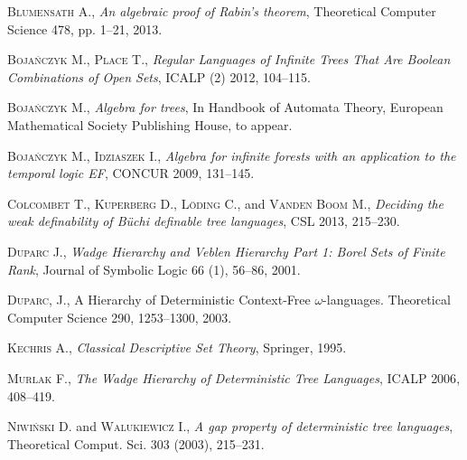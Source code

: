 \begin{thebibliography}{00}

\textsc{Blumensath} A., \emph{An algebraic proof of Rabin's theorem}, Theoretical Computer Science \textsc{478}, pp. 1--21, 2013.

\textsc{Boja\'nczyk} M., \textsc{Place} T., \emph{Regular Languages of Infinite Trees That Are Boolean Combinations of Open Sets}, ICALP (2) \textsc{2012}, 104--115.

\textsc{Boja\'nczyk} M., \emph{Algebra for trees}, In Handbook of Automata Theory, European
Mathematical Society Publishing House, to appear.

\textsc{Boja\'nczyk} M., \textsc{Idziaszek} I., \emph{Algebra for infinite forests with an
application to the temporal logic EF}, CONCUR \textsc{2009}, 131--145.


\textsc{Colcombet} T., \textsc{Kuperberg} D., \textsc{Löding} C., and \textsc{Vanden Boom} M., \emph{Deciding the weak definability of Büchi definable tree languages}, CSL \textsc{2013}, 215--230.


\textsc{Duparc} J., \emph{Wadge Hierarchy and Veblen Hierarchy Part 1: Borel Sets of Finite Rank}, Journal of Symbolic Logic \textsc{66} (1), 56--86, 2001.


\textsc{Duparc}, J., A Hierarchy of Deterministic Context-Free $\omega$-languages.
Theoretical Computer Science \textsc{290}, 1253--1300, 2003.



\textsc{Kechris} A., \emph{Classical Descriptive Set Theory}, Springer, \textsc{1995}.

\textsc{Murlak} F., \emph{The Wadge Hierarchy of Deterministic Tree Languages}, ICALP \textsc{2006}, 408--419. 

\textsc{Niwiński} D. and \textsc{Walukiewicz} I., \emph{A gap property of deterministic tree languages}, Theoretical Comput. Sci. \textsc{303} (2003), 215--231.


\end{thebibliography}
